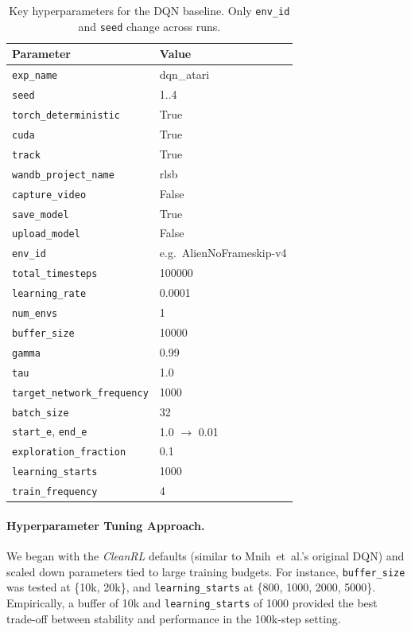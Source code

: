 \begin{table}[htbp]
	\centering
	\begin{tabular}{ll}
		\toprule
		\textbf{Parameter} & \textbf{Value} \\
		\midrule
		\texttt{exp\_name}                & dqn\_atari \\
		\texttt{seed}                     & 1..4 \\
		\texttt{torch\_deterministic}     & True \\
		\texttt{cuda}                     & True \\
		\texttt{track}                    & True \\
		\texttt{wandb\_project\_name}     & rlsb \\
		\texttt{capture\_video}           & False \\
		\texttt{save\_model}              & True \\
		\texttt{upload\_model}            & False \\
		\texttt{env\_id}                  & e.g.\ AlienNoFrameskip-v4 \\
		\texttt{total\_timesteps}         & 100000 \\
		\texttt{learning\_rate}           & 0.0001 \\
		\texttt{num\_envs}                & 1 \\
		\texttt{buffer\_size}             & 10000 \\
		\texttt{gamma}                    & 0.99 \\
		\texttt{tau}                      & 1.0 \\
		\texttt{target\_network\_frequency} & 1000 \\
		\texttt{batch\_size}             & 32 \\
		\texttt{start\_e}, \texttt{end\_e} & 1.0 $\to$ 0.01 \\
		\texttt{exploration\_fraction}    & 0.1 \\
		\texttt{learning\_starts}         & 1000 \\
		\texttt{train\_frequency}         & 4 \\
		\bottomrule
	\end{tabular}
	\caption{Key hyperparameters for the DQN baseline. Only \texttt{env\_id} and 
		\texttt{seed} change across runs.}
	\label{tab:dqn_hyperparams}
\end{table}

\paragraph{Hyperparameter Tuning Approach.}
We began with the \emph{CleanRL} defaults (similar to Mnih~et~al.’s original DQN) and
scaled down parameters tied to large training budgets. For instance,
\texttt{buffer\_size} was tested at \{10k, 20k\}, and \texttt{learning\_starts} 
at \{800, 1000, 2000, 5000\}. Empirically, a buffer of 10k 
and \texttt{learning\_starts} of 1000 provided the best trade-off between stability 
and performance in the 100k-step setting.

